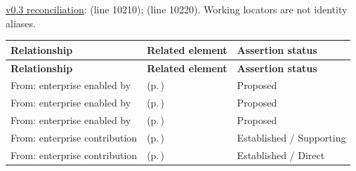\hyperref[model:reconciliation]{v0.3 reconciliation}: \texttt{} (line 10210); \texttt{} (line 10220). Working locators are not identity aliases.
\begingroup\small\setlength{\TableWidth}{\dimexpr\linewidth-6\tabcolsep-4\arrayrulewidth\relax}
\begin{longtable}{|>{\raggedright\arraybackslash}p{0.27\TableWidth}|>{\raggedright\arraybackslash}p{0.48\TableWidth}|>{\raggedright\arraybackslash}p{0.25\TableWidth}|}
\hline\rowcolor{TableHead}\textbf{Relationship} & \textbf{Related element} & \textbf{Assertion status}\\\hline\endfirsthead
\hline\rowcolor{TableHead}\textbf{Relationship} & \textbf{Related element} & \textbf{Assertion status}\\\hline\endhead
\hline\endfoot
From: enterprise enabled by & \nameref{cap:bec-information-design-governance} (p.\,\pageref{cap:bec-information-design-governance}) & Proposed\\\hline
From: enterprise enabled by & \nameref{cap:bec-clinical-knowledge-services} (p.\,\pageref{cap:bec-clinical-knowledge-services}) & Proposed\\\hline
From: enterprise enabled by & \nameref{cap:bec-governed-reference-dataset-administration} (p.\,\pageref{cap:bec-governed-reference-dataset-administration}) & Proposed\\\hline
From: enterprise contribution & \nameref{cap:bec-assurance-design} (p.\,\pageref{cap:bec-assurance-design}) & Established / Supporting\\\hline
From: enterprise contribution & \nameref{cap:bec-assurance-criteria-management} (p.\,\pageref{cap:bec-assurance-criteria-management}) & Established / Direct\\\hline
\end{longtable}\endgroup

